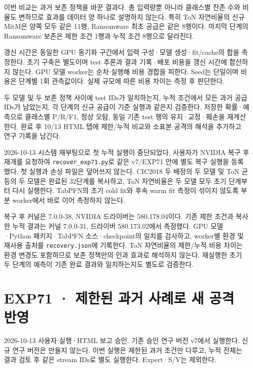 이번 비교는 과거 보존 정책을 바꾼 결과다. 총 입력량뿐 아니라 클래스별 잔존 수와 비율도 변하므로 효과를 데이터 양 하나로 설명하지 않는다. 특히 ToN 자연비율의 신규 MitM은 양쪽 모두 같은 11행, Ransomware 최초 공급은 같은 8행이다. 마지막 단계의 Ransomware 보존은 제한 조건 1행과 누적 조건 8행으로 달라진다.

갱신 시간은 동일한 GPU 동기화 구간에서 입력 구성·모델 생성·fit/\allowbreak{}cache의 합을 측정한다. 초기 구축은 별도이며 test 추론과 결과 기록·배포 비용을 갱신 시간에 합산하지 않는다. GPU 모델 worker는 순차 실행해 비용 경합을 피한다. Seed는 단일이며 비용은 단계별 1회 관측값이다. 실제 규모에 따른 비용 차이는 측정 후 판단한다.

두 모델 및 두 보존 정책 사이에 test IDs가 일치하는지, 누적 조건에서 모든 과거 공급 IDs가 남았는지, 각 단계의 신규 공급이 기준 실행과 같은지 검증한다. 저장한 확률·예측으로 클래스별 P/\allowbreak{}R/\allowbreak{}F1, 정상 오탐, 동일 기존 test 행의 유지·교정·훼손을 재계산한다. 완료 후 10/\allowbreak{}13 HTML 탭에 제한/\allowbreak{}누적 비교와 소표본 공격의 해석을 추가하고 연구 기록을 남긴다.

2026-10-13 시스템 재부팅으로 첫 누적 실행이 중단되었다. 사용자가 NVIDIA 복구 후 재개를 요청하여 \texttt{recover\_\allowbreak{}\allowbreak{}exp71.\allowbreak{}py\allowbreak{}}로 같은 v7/\allowbreak{}EXP71 안에 별도 복구 실행을 등록했다. 첫 실행과 손상 파일은 덮어쓰지 않는다. CIC2018 두 배정의 두 모델 및 ToN 균등의 두 모델은 완료된 32단계를 복사하고, ToN 자연비율은 두 모델 모두 초기 단계부터 다시 실행한다. TabPFN의 초기 cold fit와 후속 warm fit 측정이 섞이지 않도록 부분 worker에서 바로 이어 측정하지 않는다.

복구 후 커널은 7.0.0-38, NVIDIA 드라이버는 580.178.04이다. 기존 제한 조건과 복사한 누적 결과는 커널 7.0.0-31, 드라이버 580.173.02에서 측정했다. GPU 모델·Python 패키지·TabPFN 소스·checkpoint의 일치를 검사하고, worker별 환경 및 재사용 출처를 \texttt{recovery\allowbreak{}.\allowbreak{}json}에 기록한다. ToN 자연비율의 제한/\allowbreak{}누적 비용 차이는 환경 변경도 포함하므로 보존 정책만의 인과 효과로 해석하지 않는다. 재실행한 초기 두 단계의 예측이 기존 완료 결과와 일치하는지도 별도로 검증한다.



\section{EXP71 · 제한된 과거 사례로 새 공격 반영}
2026-10-13 사용자 실행·HTML 보고 승인. 기존 승인 연구 버전 v7에서 실행한다. 신규 연구 버전은 만들지 않는다. 이번 실행은 제한된 과거 조건만 다루고, 누적 전체는 결과 검토 후 같은 stream IDs로 별도 실행한다. Expert·S/\allowbreak{}V는 제외한다.

